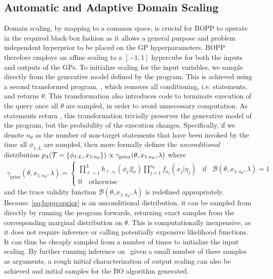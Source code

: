 
\subsection{Automatic and Adaptive Domain Scaling}
\label{sec:bopp:domain}

Domain scaling, by mapping to a common space, is crucial for BOPP to operate in the required black-box fashion as it allows a general purpose and problem independent hyperprior to be placed on the GP hyperparameters.  BOPP therefore employs an affine scaling to a $[-1,1]$ hypercube for both the inputs and outputs of the GPs.  To initialize scaling for the input variables, we sample directly from the generative model defined by the program. %
This is achieved using a second transformed program, \qprior, which removes all conditioning, i.e. \observe statements, and returns $\theta$.  This transformation also introduces code to terminate execution of the query once all $\theta$ are sampled, in order to avoid unnecessary computation.
As \observe statements return , this transformation trivially preserves the generative model of the program, 
but the probability of the execution changes. Specifically, if we denote $n_{\theta}$ as the number of non-target \sample 
statements that have been invoked by the time all $\phi_{1:L}$ are sampled, then \qprior more formally defines the
\emph{unconditional} distribution $p_{\lambda}(\mathcal{T} = \{\phi_{1:L},x_{1:n_{\theta}}\}) \propto 
\gamma_{\text{prior}}(\theta,x_{1:n_{\theta}},\lambda)$ where
\begin{align}
\label{eq:bopp:qprior}
\gamma_{\text{prior}}(\theta,x_{1:n_{\theta}},\lambda)= \begin{cases}
\prod_{\ell=1}^{L}
h_{\ell,c_{\ell}} (\phi_{\ell} | \xi_{\ell})
\prod_{j=1}^{n_{\theta}} 
f_{a_j}(x_j | \eta_j) \;\;\; \text{if} \;\;\; \mathcal{B}(\theta,x_{1:n_\theta},\lambda)=1 \\
0 \quad \text{otherwise}
\end{cases}
\end{align}
and the trace validity function $\mathcal{B}(\theta,x_{1:n_\theta},\lambda)$ is redefined appropriately.
Because~\eqref{eq:bopp:qprior} is an unconditional distribution, it can be sampled from directly by
running the program forwards, returning exact samples from the corresponding marginal distribution on $\theta$.
This is computationally inexpensive, as it does not require inference or calling potentially expensive 
likelihood functions.  It can thus be cheaply sampled from a number of times to initialize the input scaling.
By further running inference on \qmarg~given a small number of these samples as arguments, a rough initial characterization of output scaling can also be achieved and initial samples for the BO algorithm generated. 

